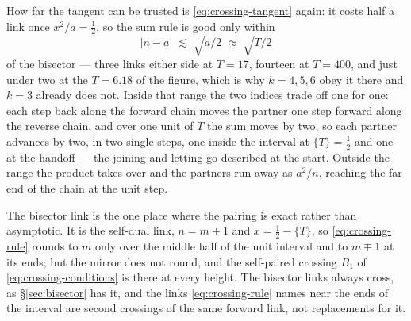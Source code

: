 \documentclass[11pt]{article}
\theoremstyle{definition}
\begin{document}
How far the tangent can be trusted is \eqref{eq:crossing-tangent} again: it
costs half a link once $x^{2}/a=\tfrac12$, so the sum rule is good only within
\begin{equation}\label{eq:crossing-reach}
|n-a|\;\lesssim\;\sqrt{a/2}\;\approx\;\sqrt{T/2}
\end{equation}
of the bisector — three links either side at $T=17$, fourteen at $T=400$, and just
under two at the $T=6.18$ of the figure, which is why $k=4,5,6$ obey it there
and $k=3$ already does not. Inside that range the two indices trade off one for
one: each step back along the forward chain moves the partner one step forward
along the reverse chain, and over one unit of $T$ the sum moves by two, so each
partner advances by two, in two single steps, one inside the interval at
$\{T\}=\tfrac12$ and one at the handoff — the joining and letting go described
at the start. Outside the range the product takes over and the partners run
away as $a^{2}/n$, reaching the far end of the chain at the unit step.

The bisector link is the one place where the pairing is exact rather than
asymptotic. It is the self-dual link, $n=m+1$ and $x=\tfrac12-\{T\}$, so
\eqref{eq:crossing-rule} rounds to $m$ only over the middle half of the unit
interval and to $m\mp1$ at its ends; but the mirror does not round, and the
self-paired crossing $B_1$ of \eqref{eq:crossing-conditions} is there at every
height. The bisector links always cross, as \S\ref{sec:bisector} has it, and
the links \eqref{eq:crossing-rule} names near the ends of the interval are
second crossings of the same forward link, not replacements for it.
\end{document}

